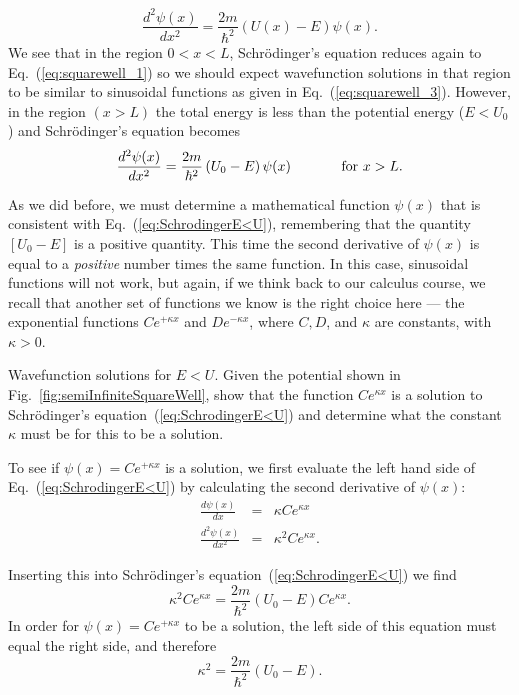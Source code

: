 \begin{equation}
\frac{d^2\psi(x)}{dx^2}  = \frac{2m}{\hbar^2}\left(U(x)-E\right)\psi(x).
\end{equation}
We see that in the region $0 < x < L$, Schr\"odinger's equation reduces
again to Eq.~(\ref{eq:squarewell_1}) so we should expect wavefunction
solutions in that region to be similar to sinusoidal functions as
given in Eq.~(\ref{eq:squarewell_3}).  However, in the region $(x >
L)$ the total energy is less than the potential energy ($E < U_0$)
and Schr\"odinger's equation becomes
\begin{equation}
\frac{d^2\psi(x)}{dx^2} =
\frac{2m}{\hbar^2}\left(U_0-E\right)\psi(x) \hspace{0.5in}\mbox{for  $x > L$}.
\label{eq:SchrodingerE<U}
\end{equation}

As we did before, we must determine a mathematical function $\psi(x)$
that is consistent with Eq.~(\ref{eq:SchrodingerE<U}),
remembering that the quantity $\left[U_0 - E\right]$ is a positive
quantity.  This time the second derivative of $\psi(x)$ is equal to a
{\it positive} number times the same function.  In this case,
sinusoidal functions will not work, but again, if we think back to our
calculus course, we recall that another set of functions we know is
the right choice here --- the exponential functions $C e^{+\kappa x}$
and $D e^{-\kappa x}$, where $C, D$, and $\kappa$ are constants,
with $\kappa > 0$.

\begin{example}{Wavefunction solutions for $E < U$.}
\label{ex:SolutionElessU}
  Given the potential shown in Fig.~\ref{fig:semiInfiniteSquareWell},
  show that the function $C e^{\kappa x}$ is a solution to
  Schr\"odinger's equation~(\ref{eq:SchrodingerE<U}) and determine
  what the constant $\kappa$ must be for this to be a solution.

 To see if $\psi(x) = C e^{+\kappa x}$ is a
solution, we first evaluate the left hand side of Eq.~(\ref{eq:SchrodingerE<U})
 by calculating the second derivative of $\psi(x)$:
\begin{eqnarray}
\frac{d \psi(x)}{dx} & = & \kappa  C e^{\kappa x} \nonumber \\
\frac{d^2 \psi(x)}{dx^2} & = & \kappa^2 C e^{\kappa x}. 
\end{eqnarray}

\noindent Inserting this into Schr\"odinger's equation~(\ref{eq:SchrodingerE<U})
we find \begin{equation}
\kappa^2 C e^{\kappa x} 
   = \frac{2m}{\hbar^2}\left( U_0 - E \right) C e^{\kappa x} .
\end{equation}
In order for $\psi(x) = C e^{+\kappa x}$ to be a solution,
the left side of this equation must equal the right side, and
therefore
\begin{equation}
\kappa^2 = \frac{2m}{\hbar^2}\left( U_0 - E \right) .
\end{equation}
\end{example}
\newpage

